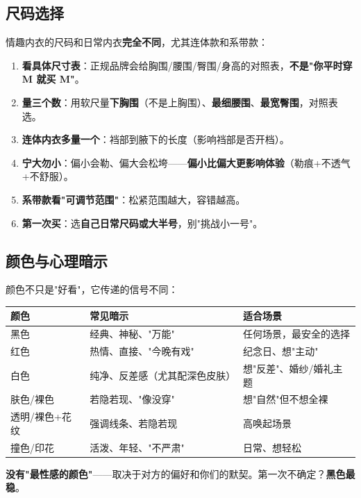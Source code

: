 \documentclass[12pt,UTF8,openany]{ctexbook}
\begin{document}
\subsection*{尺码选择}
情趣内衣的尺码和日常内衣\textbf{完全不同}，尤其连体款和系带款：
\begin{enumerate}[leftmargin=2em,itemsep=0.2em]
  \item \textbf{看具体尺寸表}：正规品牌会给胸围/腰围/臀围/身高的对照表，\textbf{不是"你平时穿 M 就买 M"}。
  \item \textbf{量三个数}：用软尺量\textbf{下胸围}（不是上胸围）、\textbf{最细腰围}、\textbf{最宽臀围}，对照表选。
  \item \textbf{连体内衣多量一个}：裆部到腋下的长度（影响裆部是否开档）。
  \item \textbf{宁大勿小}：偏小会勒、偏大会松垮——\textbf{偏小比偏大更影响体验}（勒痕+不透气+不舒服）。
  \item \textbf{系带款看"可调节范围"}：松紧范围越大，容错越高。
  \item \textbf{第一次买}：选\textbf{自己日常尺码或大半号}，别"挑战小一号"。
\end{enumerate}

\subsection*{颜色与心理暗示}
颜色不只是"好看"，它传递的信号不同：
\begin{tabularx}{\textwidth}{X X X}
\toprule
\textbf{颜色} & \textbf{常见暗示} & \textbf{适合场景} \\
\midrule
黑色 & 经典、神秘、"万能" & 任何场景，最安全的选择 \\
红色 & 热情、直接、"今晚有戏" & 纪念日、想"主动" \\
白色 & 纯净、反差感（尤其配深色皮肤） & 想"反差"、婚纱/婚礼主题 \\
肤色/裸色 & 若隐若现、"像没穿" & 想"自然"但不想全裸 \\
透明/裸色+花纹 & 强调线条、若隐若现 & 高唤起场景 \\
撞色/印花 & 活泼、年轻、"不严肃" & 日常、想轻松 \\
\bottomrule
\end{tabularx}
\par\smallskip
\textbf{没有"最性感的颜色"}——取决于对方的偏好和你们的默契。第一次不确定？\textbf{黑色最稳}。
\end{document}

